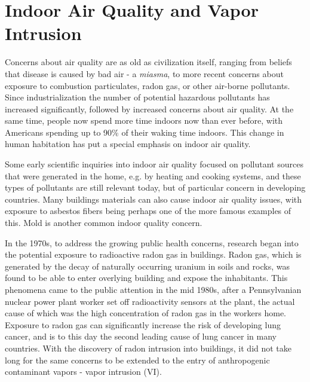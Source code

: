 \section{Indoor Air Quality and Vapor Intrusion}
Concerns about air quality are as old as civilization itself, ranging from beliefs that disease is caused by bad air - a \textit{miasma}, to more recent concerns about exposure to combustion particulates, radon gas, or other air-borne pollutants.
Since industrialization the number of potential hazardous pollutants has increased significantly, followed by increased concerns about air quality.
At the same time, people now spend more time indoors now than ever before, with Americans spending up to 90\% of their waking time indoors\cite{klepeis_national_2001}.
This change in human habitation has put a special emphasis on indoor air quality.\par

Some early scientific inquiries into indoor air quality focused on pollutant sources that were generated in the home, e.g. by heating and cooking systems, and these types of pollutants are still relevant today, but of particular concern in developing countries\cite{craig_d._hollowell_combustion-generated_1976,world_health_organisation_who_2014}.
Many buildings materials can also cause indoor air quality issues, with exposure to asbestos fibers being perhaps one of the more famous examples of this.
Mold is another common indoor quality concern\cite{world_health_organisation_who_2009}.\par

In the 1970s, to address the growing public health concerns, research began into the potential exposure to radioactive radon gas in buildings.
Radon gas, which is generated by the decay of naturally occurring uranium in soils and rocks, was found to be able to enter overlying building and expose the inhabitants.
This phenomena came to the public attention in the mid 1980s, after a Pennsylvanian nuclear power plant worker set off radioactivity sensors at the plant, the actual cause of which was the high concentration of radon gas in the workers home\cite{noauthor_health_nodate}.
Exposure to radon gas can significantly increase the risk of developing lung cancer, and is to this day the second leading cause of lung cancer in many countries\cite{gaskin_janet_global_nodate}.
With the discovery of radon intrusion into buildings, it did not take long for the same concerns to be extended to the entry of anthropogenic contaminant vapors - vapor intrusion (VI).\par

